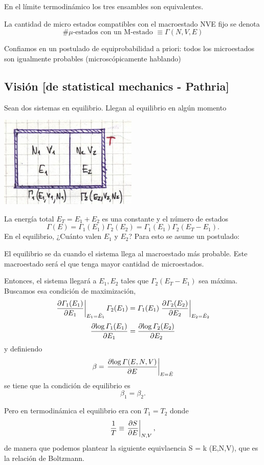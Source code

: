 \documentclass[10pt,oneside]{CBFT_book}
\begin{document}
En el límite termodinámico los tres ensambles son equivalentes.

La cantidad de micro estados compatibles con el macroestado NVE fijo se denota
\[
	\text{\#} \mu\text{-estados con un M-estado } \equiv \Gamma(N,V,E)
\]

Confiamos en un postulado de equiprobabilidad a priori: todos los microestados son igualmente probables
(microscópicamente hablando)

\subsection{Visión [de statistical mechanics - Pathria]}

Sean dos sistemas en equilibrio. Llegan al equilibrio en algún momento


\includegraphics[scale=0.5]{images/1606329365.jpg}

La energía total $ E_T = E_1 + E_2 $ es una constante y el número de estados
\[
	\Gamma(E) =  \Gamma_1(E_1) \Gamma_2(E_2) = \Gamma_1(E_1) \Gamma_2(E_T-E_1).
\]
En el equilibrio, ¿Cuánto valen $E_1$ y $E_2$? Para esto se asume un postulado:

El equilibrio se da cuando el sistema llega al macroestado más probable. Este macroestado será el que
tenga mayor cantidad de microestados.

Entonces, el sistema llegará a $E_1,E_2$ tales que $\Gamma_2(E_T-E_1)$ sea máxima. Buscamos esa
condición de maximización,
\[
	\left.\frac{\partial^{\hspace{-0.05em}} {\Gamma_1(E_1)}}{\partial {E_1}^{\hspace{-0.05em}}}\right|_{E_1=\bar{E}_1} \Gamma_2(E_1) = 
	\Gamma_1(E_1) \left.\frac{\partial^{\hspace{-0.05em}} {\Gamma_2(E_2)}}{\partial {E_2}^{\hspace{-0.05em}}}\right|_{E_2=\bar{E}_2} 
\]
\[
	\frac{\partial^{\hspace{-0.05em}} {\log \Gamma_1(E_1)}}{\partial {E_1}^{\hspace{-0.05em}}} = \frac{\partial^{\hspace{-0.05em}} {\log \Gamma_2(E_2)}}{\partial {E_2}^{\hspace{-0.05em}}}
\]
y definiendo 
\[
	\beta = \left.\frac{\partial^{\hspace{-0.05em}} {\log \Gamma(E,N,V)}}{\partial {E}^{\hspace{-0.05em}}}\right|_{E=\bar{E}} 
\]
se tiene que la condición de equilibrio es
\[
	\beta_1 = \beta_2.
\]

Pero en termodinámica el equilibrio era con $T_1=T_2$ donde 
\[
	\frac{1}{T} \equiv \left.\frac{\partial^{\hspace{-0.05em}} {S}}{\partial {E}^{\hspace{-0.05em}}}\right|_{N,V},
\]
de manera que podemos plantear la siguiente equivlaencia
\be
	S = k \log \Gamma(E,N,V),
	\label{boltzmann_relation}
\ee
que es la relación de Boltzmann.
\end{document}
